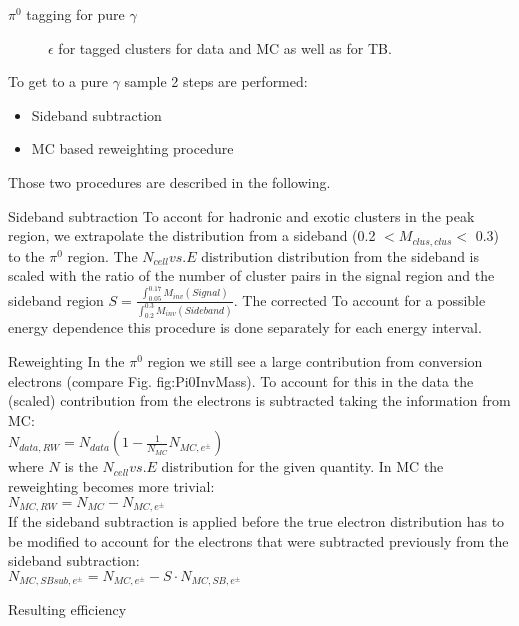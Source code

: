 \documentclass[ALICE]{ALICE_analysis_notes}
\newcommand{\PZ}{$\pi^0$\xspace}
\newcommand{\g}{$\gamma$\xspace}
\begin{document}
\begin{section}{$\pi^{0}$ tagging for pure $\gamma$}
\begin{figure}[h!]
		\caption{  $\epsilon$ for tagged clusters for data and MC as well as for TB.}
		\label{fig:NCellEff_Tagging1}
	\end{figure}
	
	
	To get to a pure \g sample 2 steps are performed:
	\begin{itemize}
		\item Sideband subtraction
		\item MC based reweighting procedure
	\end{itemize}
	Those two procedures are described in the following.
	\begin{subsection}{Sideband subtraction}
		To accont for hadronic and exotic clusters in the peak region, we extrapolate the distribution from a sideband (0.2 $< M_{clus, clus} <$ 0.3) to the \PZ region. 
		The $N_{cell} vs. E$  distribution distribution from the sideband is scaled with the ratio of the number of cluster pairs in the signal region and the sideband region $S = \frac{\int_{0.05}^{0.17} M_{inv}(Signal)}{\int_{0.2}^{0.3} M_{inv}(Sideband)}$. The corrected  To account for a possible energy dependence this procedure is done separately for each energy interval.
	\end{subsection}

	\begin{subsection}{Reweighting}
		In the \PZ region we still see a large contribution from conversion electrons (compare Fig. fig:Pi0InvMass). To account for this in the data the (scaled) contribution from the electrons is subtracted taking the information from MC:\\
		$N_{data, RW} = N_{data} ( 1 - \frac{1}{N_{MC}} N_{MC, e^{\pm}} ) $\\
		where $N$ is the $N_{cell} vs. E$ distribution for the given quantity.
		In MC the reweighting becomes more trivial:\\
		$N_{MC, RW} = N_{MC} - N_{MC, e^{\pm}} $\\
		
		If the sideband subtraction is applied before the true electron distribution has to be modified to account for the electrons that were subtracted previously from the sideband subtraction: \\
		$N_{MC, SB sub, e^{\pm}} = N_{MC, e^{\pm}} - S \cdot N_{MC, SB, e^{\pm}}$\\
		
		
	\end{subsection}
	
	\begin{subsection}{Resulting efficiency}


\end{subsection}
\end{section}
\end{document}
